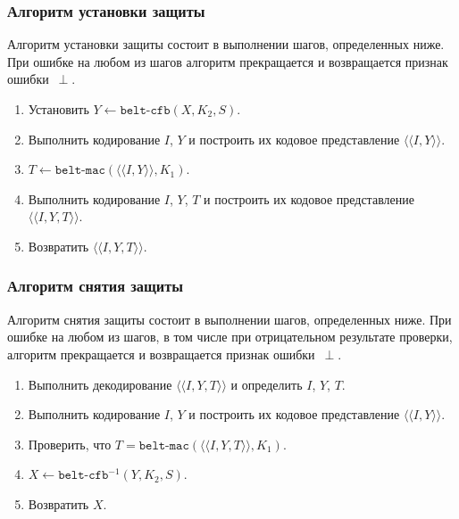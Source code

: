 \subsubsection{Алгоритм установки защиты}
\label{CRYPTO.SM.Algs.Encr}

Алгоритм установки защиты состоит в выполнении шагов, определенных ниже.
При ошибке на любом из шагов алгоритм прекращается и возвращается признак 
ошибки~$\perp$.

\begin{enumerate}
\item
Установить $Y\gets\texttt{belt-cfb}(X, K_2, S)$.

\item
Выполнить кодирование $I$, $Y$ и построить их кодовое 
представление $\langle\langle I, Y\rangle\rangle$.

\item
$T\gets\texttt{belt-mac}(\langle\langle I, Y\rangle\rangle, K_1)$.

\item
Выполнить кодирование $I$, $Y$, $T$ и построить их кодовое 
представление $\langle\langle I, Y, T \rangle\rangle$.

\item
Возвратить $\langle\langle I, Y, T \rangle\rangle$.
\end{enumerate}

\subsubsection{Алгоритм снятия защиты}
\label{CRYPTO.SM.Algs.Decr}

Алгоритм снятия защиты состоит в выполнении шагов, определенных ниже. При 
ошибке на любом из шагов, в том числе при отрицательном результате 
проверки, алгоритм прекращается и возвращается признак ошибки~$\perp$.

\begin{enumerate}
\item
Выполнить декодирование $\langle\langle I, Y, T \rangle\rangle$ 
и определить $I$, $Y$, $T$.
 
\item
Выполнить кодирование $I$, $Y$ и построить их кодовое представление 
$\langle\langle I, Y \rangle\rangle$.
 
\item
Проверить, 
что $T=\texttt{belt-mac}(\langle\langle I, Y, T\rangle\rangle, K_1)$.
 
\item
$X\leftarrow\texttt{belt-cfb}^{-1}(Y, K_2, S)$.
 
\item
Возвратить $X$.
\end{enumerate}

